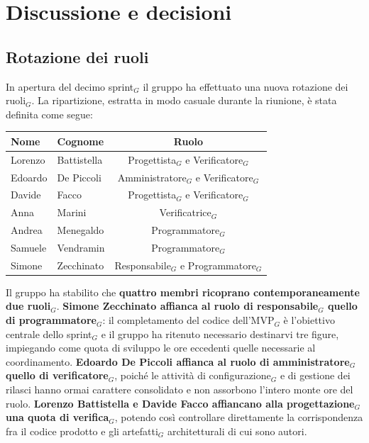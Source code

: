 \documentclass[a4paper, 10pt, colorlinks=true, linkcolor=black, urlcolor=blue, citecolor=blue, hidelinks]{article}
\begin{document}
\section{Discussione e decisioni}

\subsection{Rotazione dei ruoli}
In apertura del decimo sprint$_G$ il gruppo ha effettuato una nuova rotazione dei ruoli$_G$. La ripartizione, estratta in modo casuale durante la riunione, è stata definita come segue:
\begin{center}
    \begin{tabular}{|l|l|c|}
        \hline
        \textbf{Nome} & \textbf{Cognome} & \textbf{Ruolo} \\
        \hline
        Lorenzo & Battistella & Progettista$_G$ e Verificatore$_G$ \\
        \hline
        Edoardo & De Piccoli & Amministratore$_G$ e Verificatore$_G$ \\
        \hline
        Davide & Facco & Progettista$_G$ e Verificatore$_G$ \\
        \hline
        Anna & Marini & Verificatrice$_G$ \\
        \hline
        Andrea & Menegaldo & Programmatore$_G$ \\
        \hline
        Samuele & Vendramin & Programmatore$_G$ \\
        \hline
        Simone & Zecchinato & Responsabile$_G$ e Programmatore$_G$ \\
        \hline
    \end{tabular}
\end{center}

Il gruppo ha stabilito che \textbf{quattro membri ricoprano contemporaneamente due ruoli$_G$}. \textbf{Simone Zecchinato affianca al ruolo di responsabile$_G$ quello di programmatore$_G$}: il completamento del codice dell'MVP$_G$ è l'obiettivo centrale dello sprint$_G$ e il gruppo ha ritenuto necessario destinarvi tre figure, impiegando come quota di sviluppo le ore eccedenti quelle necessarie al coordinamento. \textbf{Edoardo De Piccoli affianca al ruolo di amministratore$_G$ quello di verificatore$_G$}, poiché le attività di configurazione$_G$ e di gestione dei rilasci hanno ormai carattere consolidato e non assorbono l'intero monte ore del ruolo. \textbf{Lorenzo Battistella e Davide Facco affiancano alla progettazione$_G$ una quota di verifica$_G$}, potendo così controllare direttamente la corrispondenza fra il codice prodotto e gli artefatti$_G$ architetturali di cui sono autori.
\end{document}
